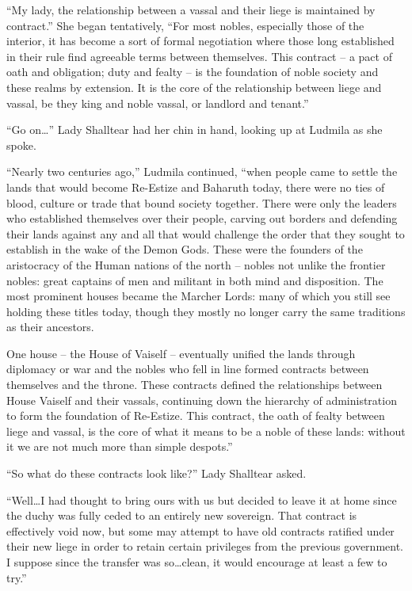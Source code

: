  

“My lady, the relationship between a vassal and their liege is maintained by contract.” She began tentatively, “For most nobles, especially those of the interior, it has become a sort of formal negotiation where those long established in their rule find agreeable terms between themselves. This contract – a pact of oath and obligation; duty and fealty – is the foundation of noble society and these realms by extension. It is the core of the relationship between liege and vassal, be they king and noble vassal, or landlord and tenant.”

 

“Go on…” Lady Shalltear had her chin in hand, looking up at Ludmila as she spoke.

 

“Nearly two centuries ago,” Ludmila continued, “when people came to settle the lands that would become Re-Estize and Baharuth today, there were no ties of blood, culture or trade that bound society together. There were only the leaders who established themselves over their people, carving out borders and defending their lands against any and all that would challenge the order that they sought to establish in the wake of the Demon Gods. These were the founders of the aristocracy of the Human nations of the north – nobles not unlike the frontier nobles: great captains of men and militant in both mind and disposition. The most prominent houses became the Marcher Lords: many of which you still see holding these titles today, though they mostly no longer carry the same traditions as their ancestors.

 

One house – the House of Vaiself – eventually unified the lands through diplomacy or war and the nobles who fell in line formed contracts between themselves and the throne. These contracts defined the relationships between House Vaiself and their vassals, continuing down the hierarchy of administration to form the foundation of Re-Estize. This contract, the oath of fealty between liege and vassal, is the core of what it means to be a noble of these lands: without it we are not much more than simple despots.”

 

“So what do these contracts look like?” Lady Shalltear asked.

 

“Well…I had thought to bring ours with us but decided to leave it at home since the duchy was fully ceded to an entirely new sovereign. That contract is effectively void now, but some may attempt to have old contracts ratified under their new liege in order to retain certain privileges from the previous government. I suppose since the transfer was so…clean, it would encourage at least a few to try.”

